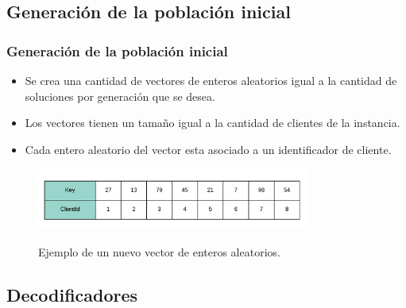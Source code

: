 \documentclass{beamer}
\begin{document}

\subsection{Generación de la población inicial}

\begin{frame}
\frametitle{Generación de la población inicial}

\begin{itemize}
    \item Se crea una cantidad de vectores de enteros aleatorios igual a la cantidad de soluciones por generación que se desea.
    \pause
    \item Los vectores tienen un tamaño igual a la cantidad de clientes de la instancia.
    \pause
    \item Cada entero aleatorio del vector esta asociado a un identificador de cliente.
    \pause
\end{itemize}

\begin{figure}[h]
	\caption{Ejemplo de un nuevo vector de enteros aleatorios.}
	\centering
	\includegraphics[width=9cm]{RandomKeysInicializado}
	\label{fig:RandomKeysInicializado}
\end{figure}

\end{frame}


\subsection{Decodificadores}
\end{document}

